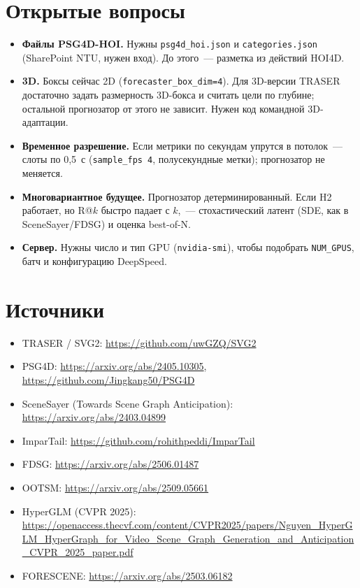 \documentclass[11pt,a4paper]{article}
\newcommand{\code}[1]{\texttt{#1}}
\begin{document}
\section{Открытые вопросы}\label{sec:open}

\begin{itemize}
  \item \textbf{Файлы PSG4D-HOI.} Нужны \code{psg4d\_hoi.json} и \code{categories.json}
        (SharePoint NTU, нужен вход). До этого~--- разметка из действий HOI4D.
  \item \textbf{3D.} Боксы сейчас 2D (\code{forecaster\_box\_dim=4}). Для 3D-версии TRASER
        достаточно задать размерность 3D-бокса и считать цели по глубине; остальной
        прогнозатор от этого не зависит. Нужен код командной 3D-адаптации.
  \item \textbf{Временное разрешение.} Если метрики по секундам упрутся в потолок~--- слоты
        по 0,5~с (\code{sample\_fps 4}, полусекундные метки); прогнозатор не меняется.
  \item \textbf{Многовариантное будущее.} Прогнозатор детерминированный. Если H2 работает, но
        R@$k$ быстро падает с $k$,~--- стохастический латент (SDE, как в SceneSayer/FDSG) и
        оценка best-of-N.
  \item \textbf{Сервер.} Нужны число и тип GPU (\code{nvidia-smi}), чтобы подобрать
        \code{NUM\_GPUS}, батч и конфигурацию DeepSpeed.
\end{itemize}

\section*{Источники}
\begin{itemize}
  \item TRASER / SVG2: \url{https://github.com/uwGZQ/SVG2}
  \item PSG4D: \url{https://arxiv.org/abs/2405.10305}, \url{https://github.com/Jingkang50/PSG4D}
  \item SceneSayer (Towards Scene Graph Anticipation): \url{https://arxiv.org/abs/2403.04899}
  \item ImparTail: \url{https://github.com/rohithpeddi/ImparTail}
  \item FDSG: \url{https://arxiv.org/abs/2506.01487}
  \item OOTSM: \url{https://arxiv.org/abs/2509.05661}
  \item HyperGLM (CVPR 2025): \url{https://openaccess.thecvf.com/content/CVPR2025/papers/Nguyen_HyperGLM_HyperGraph_for_Video_Scene_Graph_Generation_and_Anticipation_CVPR_2025_paper.pdf}
  \item FORESCENE: \url{https://arxiv.org/abs/2503.06182}
\end{itemize}
\end{document}
